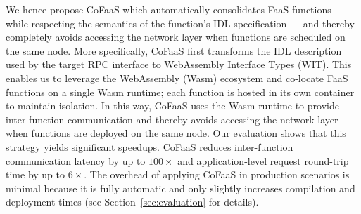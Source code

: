 We hence propose CoFaaS which automatically consolidates FaaS functions --- while respecting the semantics of the function's IDL specification --- and thereby completely avoids accessing the network layer when functions are scheduled on the same node.
More specifically, CoFaaS first transforms the IDL description used by the target RPC interface to WebAssembly Interface Types (WIT). This enables us to leverage the WebAssembly (Wasm) ecosystem and co-locate FaaS functions on a single Wasm runtime; each function is hosted in its own container to maintain isolation. %
In this way, CoFaaS uses the Wasm runtime to provide inter-function communication and thereby avoids accessing the network layer when functions are deployed on the same node. Our evaluation shows that this strategy yields significant speedups. CoFaaS reduces inter-function communication latency by up to $100\times$ and application-level request round-trip time by up to $6\times$. The overhead of applying CoFaaS in production scenarios is minimal because it is fully automatic and only slightly increases compilation and deployment times (see Section~\ref{sec:evaluation} for details).



